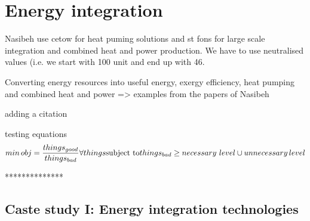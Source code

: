 \section{Energy integration}


Nasibeh use cetow for heat puming solutions and st fons for large scale integration and combined heat and power production. We have to use neutralised values (i.e. we start with 100 unit and end up with 46.


Converting energy resources into useful energy, exergy efficiency, heat pumping and combined heat and power => examples from the papers of Nasibeh

adding a citation \cite{Pouransari_2014}

testing equations
\begin{equation}
min \, obj= \frac{things_{good}}{things_{bad}} \forall things\\
\text{subject to}  \\
things_{bad}\ge necessary\,\, level \cup unnecessary \, level
\end{equation}

**************

\subsection{Caste study I: Energy integration technologies}
